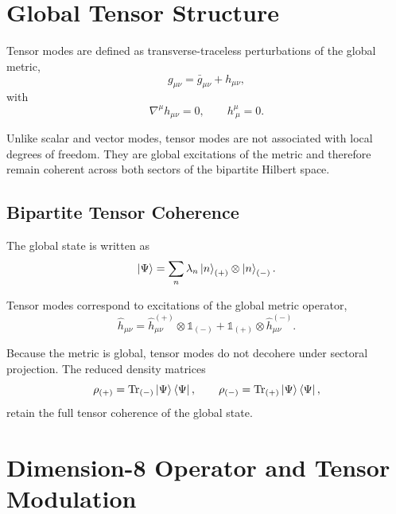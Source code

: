 \documentclass[11pt,a4paper]{article}
\begin{document}
\section{Global Tensor Structure}

Tensor modes are defined as transverse-traceless perturbations of the global
metric,
\begin{equation}
g_{\mu\nu} = \bar{g}_{\mu\nu} + h_{\mu\nu},
\end{equation}
with
\begin{equation}
\nabla^\mu h_{\mu\nu} = 0, \qquad h^\mu_{\ \mu} = 0.
\end{equation}

Unlike scalar and vector modes, tensor modes are not associated with local
degrees of freedom. They are global excitations of the metric and therefore
remain coherent across both sectors of the bipartite Hilbert space.

\subsection[Bipartite Tensor Coherence]{Bipartite Tensor Coherence}

The global state is written as
\begin{equation}
\ket{\Psi} = \sum_n \lambda_n \ket{n}_{(+)} \otimes \ket{n}_{(-)}.
\end{equation}

Tensor modes correspond to excitations of the global metric operator,
\begin{equation}
\hat{h}_{\mu\nu}
=
\hat{h}_{\mu\nu}^{(+)} \otimes \mathbb{1}_{(-)}
+
\mathbb{1}_{(+)} \otimes \hat{h}_{\mu\nu}^{(-)}.
\end{equation}

Because the metric is global, tensor modes do not decohere under sectoral
projection. The reduced density matrices
\begin{equation}
\rho_{(+)} = \Tr_{(-)} \ket{\Psi}\bra{\Psi}, \qquad
\rho_{(-)} = \Tr_{(+)} \ket{\Psi}\bra{\Psi},
\end{equation}
retain the full tensor coherence of the global state.

\section[Dimension-8 Operator and Tensor Modulation]{Dimension-8 Operator and Tensor Modulation}
\end{document}
